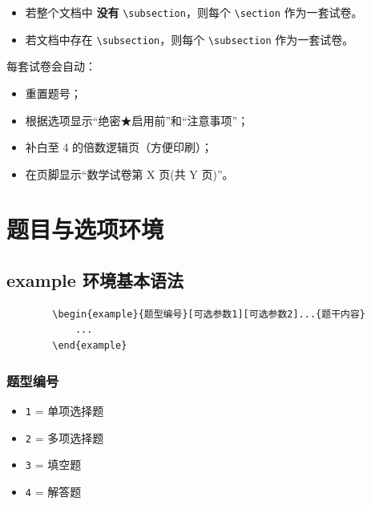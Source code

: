 \documentclass[
showanswers,        %
answercolor=red,    %
numbercolor=blue,   %
paper=a3,           %
nojuemi,              %
nozhuyishixiang,      %
example,        %
]{biscuits}
\begin{document}
	\begin{hezi}[规则]
		\begin{itemize}
			\item 若整个文档中 \textbf{没有} \verb|\subsection|，则每个 \verb|\section| 作为一套试卷。
			\item 若文档中存在 \verb|\subsection|，则每个 \verb|\subsection| 作为一套试卷。
		\end{itemize}
	\end{hezi}
	
	每套试卷会自动：
	\begin{itemize}
		\item 重置题号；
		\item 根据选项显示“绝密★启用前”和“注意事项”；
		\item 补白至 4 的倍数逻辑页（方便印刷）；
		\item 在页脚显示“数学试卷\quad 第 X 页(共 Y 页)”。
	\end{itemize}
	
	
\clearpage
	\chapter{题目与选项环境}
	\clearpage
	\section{example 环境基本语法}
	
	\begin{verbatim}
		\begin{example}{题型编号}[可选参数1][可选参数2]...{题干内容}
			...
		\end{example}
	\end{verbatim}
	
	\subsection{题型编号}
	\begin{itemize}
		\item \texttt{1} = 单项选择题
		\item \texttt{2} = 多项选择题
		\item \texttt{3} = 填空题
		\item \texttt{4} = 解答题
	\end{itemize}
	
\end{document}
